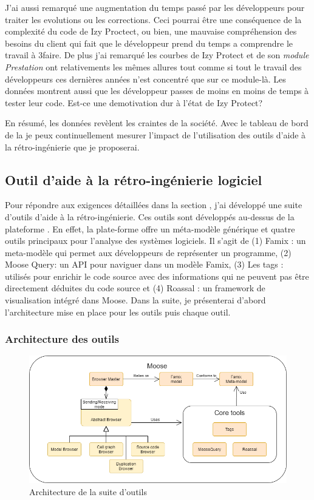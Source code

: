\documentclass[a4paper]{article}
\begin{document}
J'ai aussi remarqué une augmentation du temps passé par les développeurs pour traiter les evolutions ou les corrections.
Ceci pourrai être une conséquence de la complexité du code de Izy Proctect, ou bien, une mauvaise compréhension des besoins du client qui fait que le développeur prend du temps a comprendre le travail à 3faire.
De plus j'ai remarqué les courbes de Izy Protect et de  son \textit{module Prestation} ont relativements les mêmes allures tout comme si tout le travail des développeurs ces dernières années n'est concentré que sur ce module-là.  
Les données montrent aussi que les développeur passes de moins en moins de temps à tester leur code. Est-ce une demotivation dur à l'état de Izy Protect?

En résumé, les données revèlent les craintes de la société.
Avec le tableau de bord de la  je peux continuellement mesurer l'impact de l'utilisation des outils d'aide à la rétro-ingénierie que je proposerai.

\subsection{Outil d'aide à la rétro-ingénierie logiciel}

Pour répondre aux exigences détaillées dans la section , j'ai développé une suite d'outils d'aide à la rétro-ingénierie.
Ces outils sont développés au-dessus de la plateforme \cite{Nier05c}.
En effet, la plate-forme offre un méta-modèle générique et quatre outils principaux pour l'analyse des systèmes logiciels.
Il s'agit de (1) Famix : un meta-modèle qui permet aux développeurs de représenter un programme, (2) Moose Query: un API pour naviguer dans un modèle Famix,
(3) Les tags : utilisés pour enrichir le code source avec des informations qui ne peuvent pas être directement déduites du code source et 
(4) Roassal : un framework de visualisation intégré dans Moose.
Dans la suite, je présenterai d'abord l'architecture mise en place pour les outils puis chaque outil.

\subsubsection{Architecture des outils }
\begin{figure}[htbp]
  \begin{center}
  \includegraphics[width=0.7\linewidth]{./figures/architecture.png}
  \caption{Architecture de la suite d'outils}
  \label{fig:applicationArchitecture}
  \end{center}
  \vspace{-0.3cm}
\end{figure}
\end{document}
